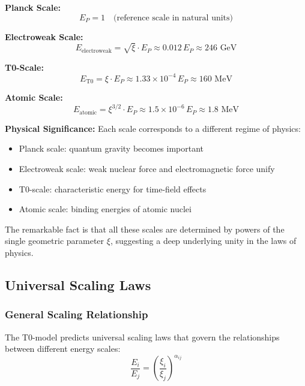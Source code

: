 \documentclass[12pt,a4paper]{article}
\newcommand{\xigeom}{\xi}
\begin{document}
	\textbf{Planck Scale:}
	\begin{equation}
		E_P = 1 \quad \text{(reference scale in natural units)}
	\end{equation}
	
	\textbf{Electroweak Scale:}
	\begin{equation}
		E_{\text{electroweak}} = \sqrt{\xigeom} \cdot E_P \approx 0.012 \, E_P \approx 246 \text{ GeV}
	\end{equation}
	
	\textbf{T0-Scale:}
	\begin{equation}
		E_{\text{T0}} = \xigeom \cdot E_P \approx 1.33 \times 10^{-4} \, E_P \approx 160 \text{ MeV}
	\end{equation}
	
	\textbf{Atomic Scale:}
	\begin{equation}
		E_{\text{atomic}} = \xigeom^{3/2} \cdot E_P \approx 1.5 \times 10^{-6} \, E_P \approx 1.8 \text{ MeV}
	\end{equation}
	
	\textbf{Physical Significance:} Each scale corresponds to a different regime of physics:
	\begin{itemize}
		\item Planck scale: quantum gravity becomes important
		\item Electroweak scale: weak nuclear force and electromagnetic force unify
		\item T0-scale: characteristic energy for time-field effects
		\item Atomic scale: binding energies of atomic nuclei
	\end{itemize}
	
	The remarkable fact is that all these scales are determined by powers of the single geometric parameter $\xigeom$, suggesting a deep underlying unity in the laws of physics.
	
	\subsection{Universal Scaling Laws}
	
	\subsubsection{General Scaling Relationship}
	
	The T0-model predicts universal scaling laws that govern the relationships between different energy scales:
	\begin{equation}
		\frac{E_i}{E_j} = \left(\frac{\xigeom_i}{\xigeom_j}\right)^{\alpha_{ij}}
	\end{equation}
	
\end{document}
